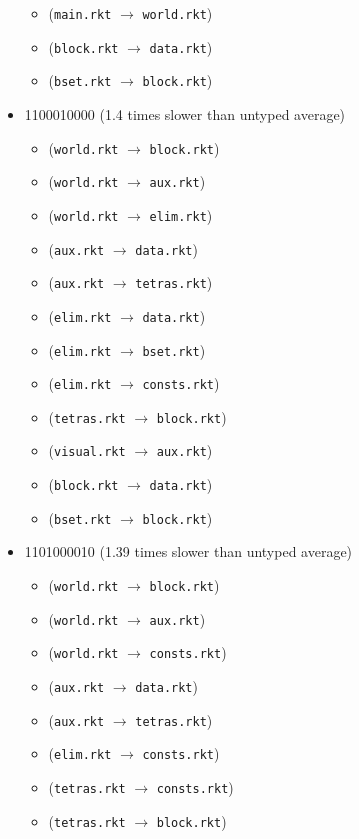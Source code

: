\documentclass{article}
\newcommand{\mono}[1]{\texttt{#1}}
\begin{document}
\begin{itemize}
\begin{itemize}
  \item (\mono{main.rkt} $\rightarrow$ \mono{world.rkt})
  \item (\mono{block.rkt} $\rightarrow$ \mono{data.rkt})
  \item (\mono{bset.rkt} $\rightarrow$ \mono{block.rkt})
  \end{itemize}
\item 1100010000 (1.4 times slower than untyped average)
  \begin{itemize}
  \item (\mono{world.rkt} $\rightarrow$ \mono{block.rkt})
  \item (\mono{world.rkt} $\rightarrow$ \mono{aux.rkt})
  \item (\mono{world.rkt} $\rightarrow$ \mono{elim.rkt})
  \item (\mono{aux.rkt} $\rightarrow$ \mono{data.rkt})
  \item (\mono{aux.rkt} $\rightarrow$ \mono{tetras.rkt})
  \item (\mono{elim.rkt} $\rightarrow$ \mono{data.rkt})
  \item (\mono{elim.rkt} $\rightarrow$ \mono{bset.rkt})
  \item (\mono{elim.rkt} $\rightarrow$ \mono{consts.rkt})
  \item (\mono{tetras.rkt} $\rightarrow$ \mono{block.rkt})
  \item (\mono{visual.rkt} $\rightarrow$ \mono{aux.rkt})
  \item (\mono{block.rkt} $\rightarrow$ \mono{data.rkt})
  \item (\mono{bset.rkt} $\rightarrow$ \mono{block.rkt})
  \end{itemize}
\item 1101000010 (1.39 times slower than untyped average)
  \begin{itemize}
  \item (\mono{world.rkt} $\rightarrow$ \mono{block.rkt})
  \item (\mono{world.rkt} $\rightarrow$ \mono{aux.rkt})
  \item (\mono{world.rkt} $\rightarrow$ \mono{consts.rkt})
  \item (\mono{aux.rkt} $\rightarrow$ \mono{data.rkt})
  \item (\mono{aux.rkt} $\rightarrow$ \mono{tetras.rkt})
  \item (\mono{elim.rkt} $\rightarrow$ \mono{consts.rkt})
  \item (\mono{tetras.rkt} $\rightarrow$ \mono{consts.rkt})
  \item (\mono{tetras.rkt} $\rightarrow$ \mono{block.rkt})

\end{itemize}
\end{itemize}
\end{document}
